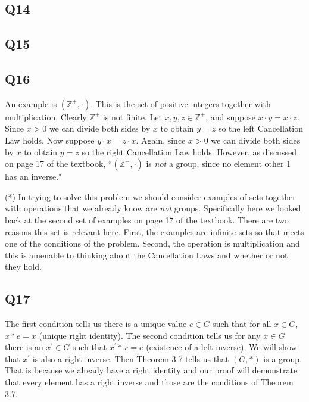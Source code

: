 \documentclass[12pt]{article}
\def\Z{{\mathbb Z}}        %
\numberwithin{theorem}{section}
\numberwithin{equation}{section}
\numberwithin{remark}{section}
\numberwithin{definition}{section}
\numberwithin{theorem}{section}
\numberwithin{lemma}{section}
\numberwithin{example}{section}
\begin{document}
\subsection{Q14}

\subsection{Q15}

\subsection{Q16}

An example is $(\Z^{+},\cdot)$. This is the set of positive integers together with multiplication. Clearly $\Z^{+}$ is not finite. Let $x,y,z\in\Z^{+}$, and suppose $x\cdot y = x\cdot z$. Since $x>0$ we can divide both sides by $x$ to obtain $y=z$ so the left Cancellation Law holds. Now suppose $y\cdot x = z\cdot x$. Again, since $x>0$ we can divide both sides by $x$ to obtain $y=z$ so the right Cancellation Law holds. However, as discussed on page 17 of the textbook, ``$(\Z^{+},\cdot)$ is \emph{not} a group, since no element other 1 has an inverse."

\vspace{\baselineskip}

\noindent (*) In trying to solve this problem we should consider examples of sets together with operations that we already know are \emph{not} groups. Specifically here we looked back at the second set of examples on page 17 of the textbook. There are two reasons this set is relevant here. First, the examples are infinite sets so that meets one of the conditions of the problem. Second, the operation is multiplication and this is amenable to thinking about the Cancellation Laws and whether or not they hold. 



\subsection{Q17}

The first condition tells us there is a unique value $e\in G$ such that for all $x\in G$, $x*e=x$ (unique right identity). The second condition tells us for any $x\in G$ there is an $x^\prime\in G$ such that $x^\prime * x = e$ (existence of a left inverse). We will show that $x^\prime$ is also a right inverse. Then Theorem 3.7 tells us that $(G,*)$ is a group. That is because we already have a right identity and our proof will demonstrate that every element has a right inverse and those are the conditions of Theorem 3.7. 
\end{document}
